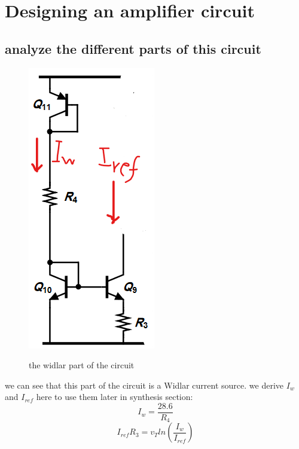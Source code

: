 \documentclass[11pt]{article}
\begin{document}
\section{Designing an amplifier circuit}
\subsection{analyze the different parts of this circuit}
\begin{figure}[H]
    \begin{center}
        \includegraphics[scale=0.7]{Fig/widlar.png}
        \label{fig:widlar}
        \caption{the widlar part of the circuit}
    \end{center}
\end{figure}
we can see that this part of the circuit is a Widlar current source.
we derive $I_w$ and $I_{ref}$ here to use them later in synthesis section:
$$ I_w = \frac{28.6}{R_4} $$
$$ I_{ref}R_3 = v_Tln(\frac{I_w}{I_{ref}}) $$
\end{document}
